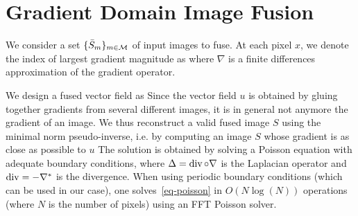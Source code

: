 
\section{Gradient Domain Image Fusion}
\label{app-fusion}

We consider a set $\{\bar S_m\}_{m \in \mathcal{M}}$ of input images to fuse. 
At each pixel $x$, we denote the index of largest gradient magnitude as
where $\nabla$ is a finite differences approximation of the gradient operator. 

We design a fused vector field as
Since the vector field $u$ is obtained by gluing together gradients from several different images, it is in general not anymore the gradient of an image. We thus reconstruct a valid fused image $S$ using the minimal norm pseudo-inverse, i.e. by computing an image $S$ whose gradient is as close as possible to $u$
The solution is obtained by solving a Poisson equation
with adequate boundary conditions, where $\Delta = \operatorname{div} \circ \nabla$ is the Laplacian operator and $\operatorname{div} = -\nabla^*$ is the divergence. When using periodic boundary conditions (which can be used in our case), one solves~\eqref{eq-poisson} in $O(N \log(N))$ operations (where $N$ is the number of pixels) using an FFT Poisson solver.
